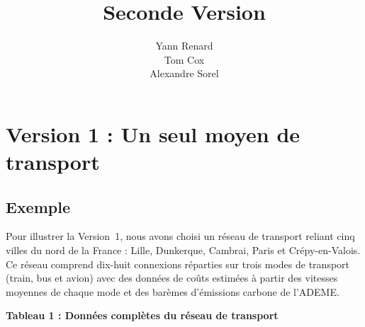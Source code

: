 \documentclass[fontsize=10pt,oneside,parskip=half]{scrreprt}
\title{Seconde Version}
\author{Yann Renard \\ Tom Cox \\ Alexandre Sorel}
\begin{document}

\maketitle
\pagecolor{Blanc}
{%
  \setlength{\parskip}{0pt}%
  \tableofcontents%
}

\chapter{Version 1 : Un seul moyen de transport}

\section{Exemple}

Pour illustrer la Version~1, nous avons choisi un réseau de transport reliant
cinq villes du nord de la France : Lille, Dunkerque, Cambrai, Paris et
Crépy-en-Valois. Ce réseau comprend dix-huit connexions réparties sur trois modes
de transport (train, bus et avion) avec des données de coûts estimées à partir
des vitesses moyennes de chaque mode et des barèmes d'émissions carbone de
l'ADEME.

\noindent\textbf{Tableau 1 : Données complètes du réseau de transport}

% 
\end{document}

